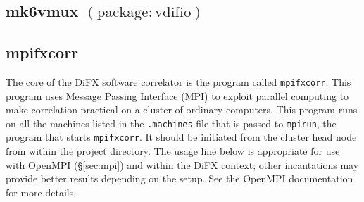 
\subsection{mk6vmux {\small $\mathrm{(package: vdifio)}$}} \label{sec:mk6vmux} 





\subsection{mpifxcorr} \label{sec:mpifxcorr}

The core of the DiFX software correlator is the program called {\tt mpifxcorr}.
This program uses Message Passing Interface (MPI) to exploit parallel computing to make correlation practical on a cluster of ordinary computers.
This program runs on all the machines listed in the {\tt .machines} file that is passed to {\tt mpirun}, the program that starts {\tt mpifxcorr}.
It should be initiated from the cluster head node from within the project directory.
The usage line below is appropriate for use with OpenMPI (\S\ref{sec:mpi}) and within the DiFX context; other incantations may provide better results depending on the setup.
See the OpenMPI documentation for more details.

